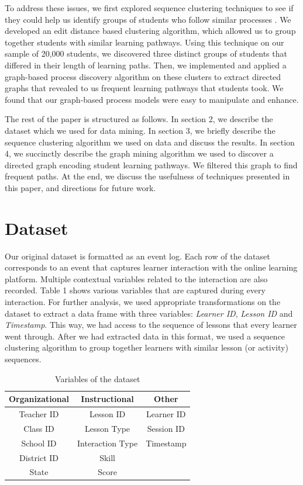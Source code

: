 \documentclass{edm_template}
\begin{document}
To address these issues, we first explored sequence clustering techniques to see if they could help us identify groups of students who follow similar processes \cite{hompesdiscovering}. We developed an edit distance based clustering algorithm, which allowed us to group together students with similar learning pathways. Using this technique on our sample of 20,000 students, we discovered three distinct groups of students that differed in their length of learning paths. Then, we implemented and applied a graph-based process discovery algorithm on these clusters to extract directed graphs that revealed to us frequent learning pathways that students took. We found that our graph-based process models were easy to manipulate and enhance.

The rest of the paper is structured as follows. In section 2, we describe the dataset which we used for data mining. In section 3, we briefly describe the sequence clustering algorithm we used on data and discuss the results. In section 4, we succinctly describe the graph mining algorithm we used to discover a directed graph encoding student learning pathways. We filtered this graph to find frequent paths. At the end, we discuss the usefulness of techniques presented in this paper, and directions for future work.

\section{Dataset}
Our original dataset is formatted as an event log. Each row of the dataset corresponds to an event that captures learner interaction with the online learning platform. Multiple contextual variables related to the interaction are also recorded. Table 1 shows various variables that are captured during every interaction. For further analysis, we used appropriate transformations on the dataset to extract a data frame with three variables: \textit{Learner ID}, \textit{Lesson ID} and \textit{Timestamp}. This way, we had access to the sequence of lessons that every learner went through. After we had extracted data in this format, we used a sequence clustering algorithm to group together learners with similar lesson (or activity) sequences.

\begin{table}
\centering
\caption{Variables of the dataset}
\begin{tabular}{ c c c } \hline
Organizational & Instructional & Other \\ \hline
Teacher ID  & Lesson ID & Learner ID \\
Class ID & Lesson Type & Session ID \\
School ID & Interaction Type & Timestamp \\
District ID & Skill & \\
State & Score & \\
\hline\end{tabular}
\end{table}
\end{document}
